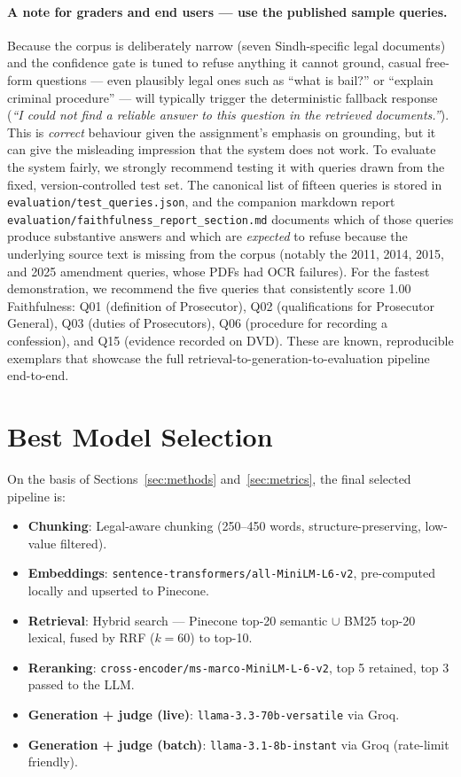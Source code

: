 \documentclass[11pt,a4paper]{article}
\begin{document}
\paragraph{A note for graders and end users --- use the published sample queries.}
Because the corpus is deliberately narrow (seven Sindh-specific legal documents) and the confidence gate is tuned to refuse anything it cannot ground, casual free-form questions --- even plausibly legal ones such as ``what is bail?'' or ``explain criminal procedure'' --- will typically trigger the deterministic fallback response (\emph{``I could not find a reliable answer to this question in the retrieved documents.''}). This is \emph{correct} behaviour given the assignment's emphasis on grounding, but it can give the misleading impression that the system does not work. To evaluate the system fairly, we strongly recommend testing it with queries drawn from the fixed, version-controlled test set. The canonical list of fifteen queries is stored in \texttt{evaluation/test\_queries.json}, and the companion markdown report \texttt{evaluation/faithfulness\_report\_section.md} documents which of those queries produce substantive answers and which are \emph{expected} to refuse because the underlying source text is missing from the corpus (notably the 2011, 2014, 2015, and 2025 amendment queries, whose PDFs had OCR failures). For the fastest demonstration, we recommend the five queries that consistently score 1.00 Faithfulness: Q01 (definition of Prosecutor), Q02 (qualifications for Prosecutor General), Q03 (duties of Prosecutors), Q06 (procedure for recording a confession), and Q15 (evidence recorded on DVD). These are known, reproducible exemplars that showcase the full retrieval-to-generation-to-evaluation pipeline end-to-end.

\newpage
\section{Best Model Selection}
\label{sec:best}

On the basis of Sections~\ref{sec:methods} and~\ref{sec:metrics}, the final selected pipeline is:

\begin{itemize}[leftmargin=*]
    \item \textbf{Chunking}: Legal-aware chunking (250--450 words, structure-preserving, low-value filtered).
    \item \textbf{Embeddings}: \texttt{sentence-transformers/all-MiniLM-L6-v2}, pre-computed locally and upserted to Pinecone.
    \item \textbf{Retrieval}: Hybrid search --- Pinecone top-20 semantic $\cup$ BM25 top-20 lexical, fused by RRF ($k=60$) to top-10.
    \item \textbf{Reranking}: \texttt{cross-encoder/ms-marco-MiniLM-L-6-v2}, top 5 retained, top 3 passed to the LLM.
    \item \textbf{Generation + judge (live)}: \texttt{llama-3.3-70b-versatile} via Groq.
    \item \textbf{Generation + judge (batch)}: \texttt{llama-3.1-8b-instant} via Groq (rate-limit friendly).
\end{itemize}
\end{document}
